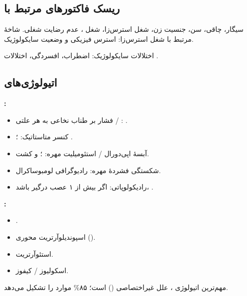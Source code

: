 \documentclass[12pt,a4paper]{article}
\begin{document}
\subsection*{ریسک فاکتورهای مرتبط با }
سیگار، چاقی، سن، جنسیت زن، شغل استرس‌زا، شغل ، عدم رضایت شغلی.
شاخهٔ مرتبط با شغل استرس‌زا: استرس فیزیکی و وضعیت سایکولوژیک.

اختلالات سایکولوژیک: اضطراب، افسردگی، اختلالات .

\subsection*{اتیولوژی‌های }
\textbf{:}
\begin{itemize}
  \item فشار بر طناب نخاعی به هر علتی / : .
  \item کنسر متاستاتیک: ؛ .
  \item آبسهٔ اپی‌دورال / استئومیلیت مهره: ؛  و کشت.
  \item شکستگی فشردهٔ مهره: رادیوگرافی لومبوساکرال.
  \item رادیکولوپاتی: اگر بیش از ۱ عصب درگیر باشد، .
\end{itemize}
\textbf{:}
\begin{itemize}
  \item {}.
  \item اسپوندیلوآرتریت محوری ().
  \item استئوآرتریت.
  \item اسکولیوز / کیفوز.
\end{itemize}
مهم‌ترین اتیولوژی ، علل غیراختصاصی () است؛ ۸۵\% موارد را تشکیل می‌دهد.
\end{document}
